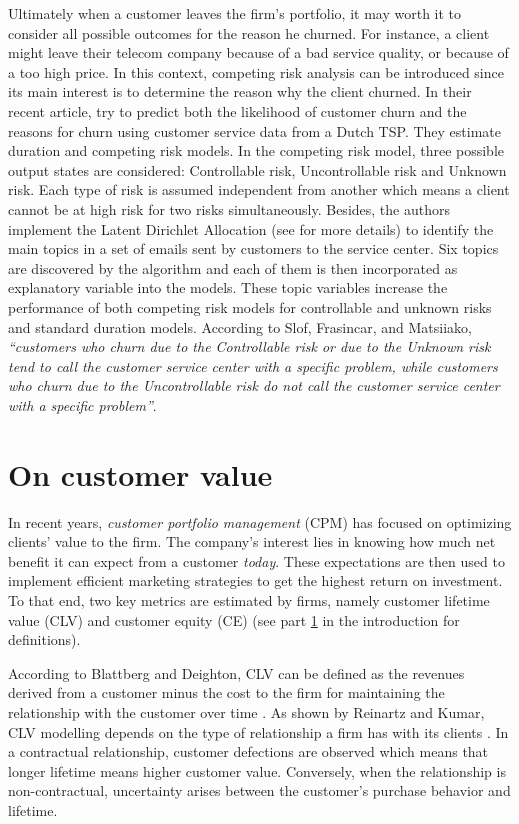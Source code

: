 \documentclass[
]{book}
\begin{document}
Ultimately when a customer leaves the firm's portfolio, it may worth it to consider all possible outcomes for the reason he churned. For instance, a client might leave their telecom company because of a bad service quality, or because of a too high price. In this context, competing risk analysis can be introduced since its main interest is to determine the reason why the client churned. In their recent article, \citet{COMPETING_RISKS} try to predict both the likelihood of customer churn and the reasons for churn using customer service data from a Dutch TSP. They estimate duration and competing risk models. In the competing risk model, three possible output states are considered: Controllable risk, Uncontrollable risk and Unknown risk. Each type of risk is assumed independent from another which means a client cannot be at high risk for two risks simultaneously. Besides, the authors implement the Latent Dirichlet Allocation (see \citet{LDA} for more details) to identify the main topics in a set of emails sent by customers to the service center. Six topics are discovered by the algorithm and each of them is then incorporated as explanatory variable into the models. These topic variables increase the performance of both competing risk models for controllable and unknown risks and standard duration models. According to Slof, Frasincar, and Matsiiako, \emph{``customers who churn due to the Controllable risk or due to the Unknown risk tend to call the customer service center with a specific problem, while customers who churn due to the Uncontrollable risk do not call the customer service center with a specific problem''}.

\hypertarget{value}{%
\section{On customer value}\label{value}}

In recent years, \emph{customer portfolio management} (CPM) has focused on optimizing clients' value to the firm. The company's interest lies in knowing how much net benefit it can expect from a customer \emph{today}. These expectations are then used to implement efficient marketing strategies to get the highest return on investment. To that end, two key metrics are estimated by firms, namely customer lifetime value (CLV) and customer equity (CE) (see part \ref{value} in the introduction for definitions).

According to Blattberg and Deighton, CLV can be defined as the revenues derived from a customer minus the cost to the firm for maintaining the relationship with the customer over time \citep{CLV_DEF}. As shown by Reinartz and Kumar, CLV modelling depends on the type of relationship a firm has with its clients \citep{CLV_CONTEXT}. In a contractual relationship, customer defections are observed which means that longer lifetime means higher customer value. Conversely, when the relationship is non-contractual, uncertainty arises between the customer's purchase behavior and lifetime.
\end{document}
